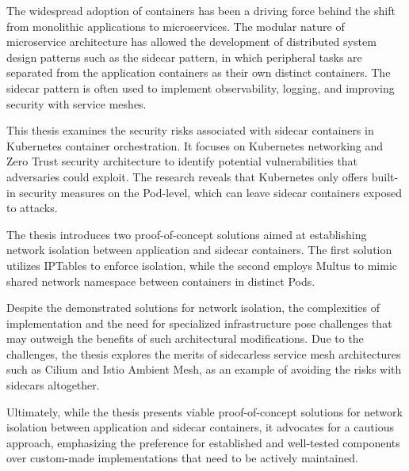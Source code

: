 \documentclass[english, 12pt, a4paper, sci, utf8, a-2b, online]{aaltothesis}
\date{29.12.2023}
\begin{document}
\makecoverpage
\makecopyrightpage

\clearpage



\begin{abstractpage}[english]
  The widespread adoption of containers has been a driving force behind the shift from monolithic applications to microservices.
  The modular nature of microservice architecture has allowed the development of distributed system design patterns such as the sidecar pattern, in which peripheral tasks are separated from the application containers as their own distinct containers.
  The sidecar pattern is often used to implement observability, logging, and improving security with service meshes.

  This thesis examines the security risks associated with sidecar containers in Kubernetes container orchestration.
  It focuses on Kubernetes networking and Zero Trust security architecture to identify potential vulnerabilities that adversaries could exploit.
  The research reveals that Kubernetes only offers built-in security measures on the Pod-level, which can leave sidecar containers exposed to attacks.

  The thesis introduces two proof-of-concept solutions aimed at establishing network isolation between application and sidecar containers.
  The first solution utilizes IPTables to enforce isolation, while the second employs Multus to mimic shared network namespace between containers in distinct Pods.

  Despite the demonstrated solutions for network isolation, the complexities of implementation and the need for specialized infrastructure pose challenges that may outweigh the benefits of such architectural modifications.
  Due to the challenges, the thesis explores the merits of sidecarless service mesh architectures such as Cilium and Istio Ambient Mesh, as an example of avoiding the risks with sidecars altogether.

  Ultimately, while the thesis presents viable proof-of-concept solutions for network isolation between application and sidecar containers, it advocates for a cautious approach, emphasizing the preference for established and well-tested components over custom-made implementations that need to be actively maintained.
\end{abstractpage}
\end{document}
